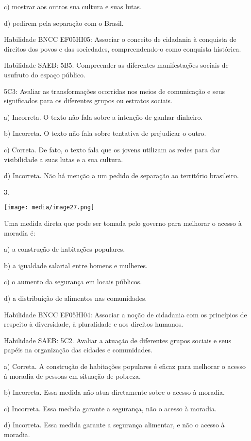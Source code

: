 c) mostrar aos outros sua cultura e suas lutas.

d) pedirem pela separação com o Brasil.

Habilidade BNCC EF05HI05: Associar o conceito de cidadania à conquista
de direitos dos povos e das sociedades, compreendendo-o como conquista
histórica.

Habilidade SAEB: 5B5. Compreender as diferentes manifestações sociais de
usufruto do espaço público.

5C3: Avaliar as transformações ocorridas nos meios de comunicação e seus
significados para os diferentes grupos ou estratos sociais.

a) Incorreta. O texto não fala sobre a intenção de ganhar dinheiro.

b) Incorreta. O texto não fala sobre tentativa de prejudicar o outro.

c) Correta. De fato, o texto fala que os jovens utilizam as redes para
dar visibilidade a suas lutas e a sua cultura.

d) Incorreta. Não há menção a um pedido de separação ao território
brasileiro.

3.

\texttt{[image: media/image27.png]}

Uma medida direta que pode ser tomada pelo governo para melhorar o
acesso à moradia é:

a) a construção de habitações populares.

b) a igualdade salarial entre homens e mulheres.

c) o aumento da segurança em locais públicos.

d) a distribuição de alimentos nas comunidades.

Habilidade BNCC EF05HI04: Associar a noção de cidadania com os
princípios de respeito à diversidade, à pluralidade e aos direitos
humanos.

Habilidade SAEB: 5C2. Avaliar a atuação de diferentes grupos sociais e
seus papéis na organização das cidades e comunidades.

a) Correta. A construção de habitações populares é eficaz para melhorar
o acesso à moradia de pessoas em situação de pobreza.

b) Incorreta. Essa medida não atua diretamente sobre o acesso à moradia.

c) Incorreta. Essa medida garante a segurança, não o acesso à moradia.

d) Incorreta. Essa medida garante a segurança alimentar, e não o acesso
à moradia.

